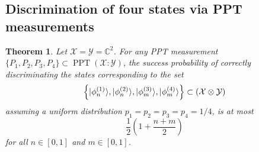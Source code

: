 \documentclass[11pt]{article}
\newtheorem{theorem}{Theorem}
\theoremstyle{definition}
\newcommand{\microspace}{\mspace{0.5mu}}
\newcommand{\ppt}{\operatorname{PPT}}
\newcommand{\ket}[1]{
  \lvert\microspace #1 \microspace \rangle}
\newcommand{\complex}{\mathbb{C}}
\newcommand{\X}{\mathcal{X}}
\newcommand{\Y}{\mathcal{Y}}
\begin{document}
\subsection*{Discrimination of four states via PPT measurements}
\label{sec:discrim-four-states-ppt-no-resource}

\begin{theorem}
    Let $\X = \Y = \complex^2$. For any PPT measurement $\{ P_1, P_2, P_3, P_4
    \} \subset \ppt(\X : \Y)$, the success probability of correctly
    discriminating the states corresponding to the set 
	\begin{equation}
        \left\{ 
            \ket{\phi_n^{(1)}},
            \ket{\phi_n^{(2)}},
            \ket{\phi_m^{(3)}},
            \ket{\phi_m^{(4)}} 
        \right\} \subset 
        \left(\X \otimes \Y \right)
	\end{equation}
    assuming a uniform distribution $p_1 = p_2 = p_3 = p_4 = 1/4$, is at most
    \begin{equation}
        \frac{1}{2} \left(1 + \frac{n+m}{2}\right)
    \end{equation}
    for all $n \in [0, 1]$ and $m \in [0, 1]$.
\end{theorem}
\end{document}

